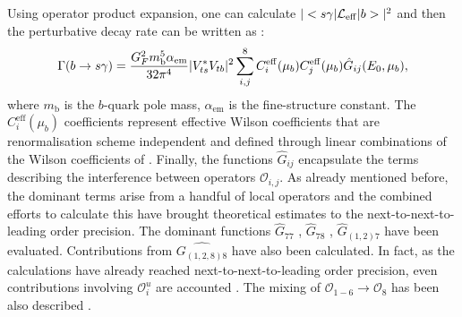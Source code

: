 Using operator product expansion, one can calculate $|<s\gamma|\mathcal{L}_{\mathrm{eff}}|b>|^2$ and then the perturbative decay rate can be written as \cite{Misiak:2020vlo}:
\begin{equation}\label{eq:theory_decay_rate}
    \Gamma(b\rightarrow s\gamma) = \frac{G^2_F m_{\mathrm{b}}^5 \alpha_{\mathrm{em}}}{32\pi^4}|V_{ts}^*V_{tb}|^2\sum_{i,j}^8C^{\mathrm{eff}}_{i}(\mu_b)C^{\mathrm{eff}}_{j}(\mu_b)\hat{G}_{ij}(E_0,\mu_b),
\end{equation}
where $m_{\mathrm{b}}$ is the $b$-quark pole mass, $\alpha_{\mathrm{em}}$ is the fine-structure constant.
The $C_{i}^{\mathrm{eff}}(\mu_b)$ coefficients represent effective Wilson coefficients \cite{Buras:1993xp} that are renormalisation scheme independent and defined through linear combinations of the Wilson coefficients of .
Finally, the functions $\hat{G}_{ij}$ encapsulate the terms describing the interference between operators $\mathcal{O}_{i,j}$.
As already mentioned before, the dominant terms arise from a handful of local operators and the combined efforts to calculate this have brought \BtoXsgamma theoretical estimates to the next-to-next-to-leading order precision.
The dominant functions $\hat{G}_{77}$ \cite{Asatrian:2006rq}, $\hat{G}_{78}$ \cite{Asatrian:2010rq}, $\hat{G}_{(1,2)7}$ \cite{Boughezal:2007ny,Misiak:2020vlo} have been evaluated.
Contributions from $\hat{G_{(1,2,8)8}}$ \cite{Ferroglia:2010xe,Misiak:2010tk} have also been calculated.
In fact, as the calculations have already reached next-to-next-to-leading order precision, even contributions involving $\mathcal{O}_{i}^u$ are accounted \cite{Huber:2014nna}.
The mixing of $\mathcal{O}_{1-6}\to\mathcal{O}_8$ has been also described \cite{Czakon:2006ss}. 

